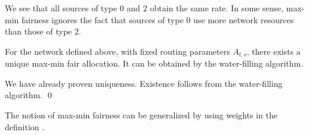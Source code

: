 We see that all sources of type $0$ and $2$ obtain
the same rate. In some sense, max-min fairness ignores the
fact that sources of type $0$ use more network resources than
those of type $2$.

\begin{theorem}For the network defined above,
 with fixed routing parameters $A_{l,s}$, there exists a unique
        max-min fair allocation.  It can be obtained by the water-filling algorithm.
\end{theorem}
\pr We have already proven uniqueness.  Existence follows from the water-filling algorithm. \qed



The notion of max-min fairness can be generalized by
using weights in the definition \cite{BG, MR98}. 
